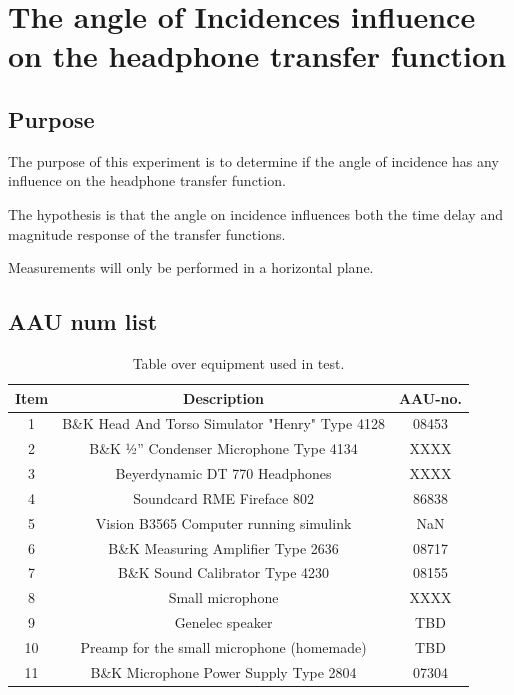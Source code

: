 
\section{The angle of Incidences influence on the headphone transfer function}

\subsection{Purpose}
The purpose of this experiment is to determine if the angle of incidence has any influence on the headphone transfer function. 

The hypothesis is that the angle on incidence influences both the time delay and magnitude response of the transfer functions.

Measurements will only be performed in a horizontal plane. 

\subsection{AAU num list}
\begin{table}[H]
	\centering
	\begin{tabular}{ c c c } \toprule
		{Item}	& {Description} 						& {AAU-no}. \\ \bottomrule 
		1	&	B\&K Head And Torso Simulator "Henry" Type 4128	& 08453	\\
		2	&	B\&K ½'' Condenser Microphone Type 4134 	& XXXX		\\
		3	&	Beyerdynamic DT 770 Headphones				& XXXX		\\
		4	&	Soundcard RME Fireface 802					& 86838		\\
		5	&	Vision B3565 Computer running simulink		& NaN		\\
		6	&	B\&K Measuring Amplifier Type 2636			& 08717		\\
		7	&	B\&K Sound Calibrator Type 4230				& 08155		\\ 
		8	&	Small microphone							& XXXX		\\
		9	&	Genelec speaker								& TBD		\\ 
		10	&	Preamp for the small microphone	(homemade)	& TBD\\
		11	& 	B\&K Microphone Power Supply Type 2804		& 07304		\\
		\bottomrule
	\end{tabular}
	\caption{Table over equipment used in test.}
	\label{tab:AngleOfIncideceHP}
\end{table}

